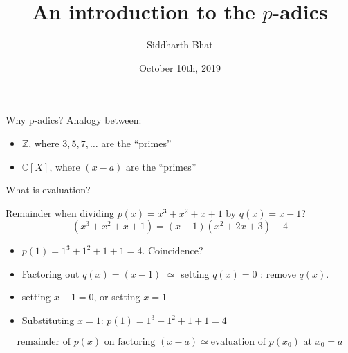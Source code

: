 \documentclass[8pt]{beamer}
\author{Siddharth Bhat}
\date{October 10th, 2019}
\institute{IIIT Theory group \\ Seminar Saturday}
\title{An introduction to the $p$-adics}
\begin{document}
\maketitle

\begin{frame}[label=sec-1]{Why p-adics?}
Analogy between:
\begin{itemize}
\item $\mathbb Z$, \pause where $3, 5, 7, \dots$ are the ``primes''\pause
\item $\mathbb C[X]$, \pause where $(x - a)$ are the ``primes''
\end{itemize}
\end{frame}

\begin{frame}{What is evaluation?}

Remainder when dividing $p(x) = x^3 + x^2 + x + 1$ by $q(x) = x - 1$? \pause
{}
\pause
$$(x^3+ x^2 + x + 1) = (x-1)(x^2 + 2x + 3) + 4$$
\pause
\begin{itemize}
\item $p(1) = 1^3 + 1^2 + 1 + 1 = 4$. Coincidence? \pause
\item Factoring out $q(x) = (x-1)$ \pause $ \simeq $ setting $q(x) = 0$ \pause : remove $q(x)$. \pause
\item setting $x - 1 = 0$, or setting $x = 1$ \pause
\item Substituting $x = 1$:  $p(1) = 1^3 + 1^2 + 1 + 1 = 4$ \pause
\end{itemize}

$$
\text{remainder of $p(x)$ on factoring $(x - a)$} \simeq \text{evaluation of $p(x_0)$ at $x_0 = a$}
$$
\end{frame}
\end{document}
